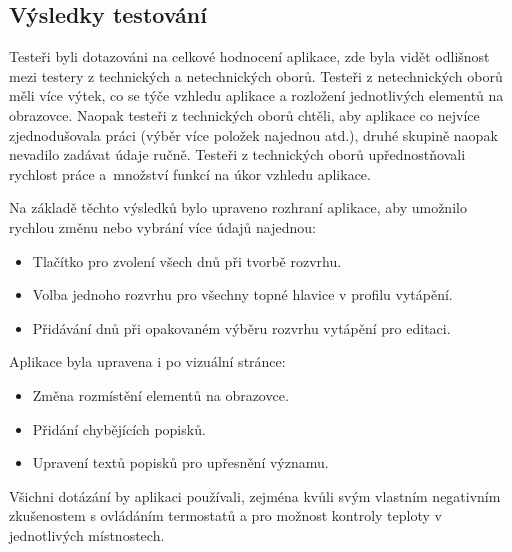 \documentclass[thesis=B,czech]{FITthesis}[2012/10/20]
\begin{document}
\subsection{Výsledky testování}

Testeři byli dotazováni na celkové hodnocení aplikace, zde byla vidět odlišnost mezi testery z technických a netechnických oborů. Testeři z netechnických oborů měli více výtek, co se týče vzhledu aplikace a rozložení jednotlivých elementů na obrazovce. Naopak testeři z technických oborů chtěli, aby aplikace co nejvíce zjednodušovala práci (výběr více položek najednou atd.), druhé skupině naopak nevadilo zadávat údaje ručně. Testeři z technických oborů upřednostňovali rychlost práce a~množství funkcí na úkor vzhledu aplikace. 

Na základě těchto výsledků bylo upraveno rozhraní aplikace, aby umožnilo rychlou změnu nebo vybrání více údajů najednou:

\begin{itemize}
\item Tlačítko pro zvolení všech dnů při tvorbě rozvrhu.
\item Volba jednoho rozvrhu pro všechny topné hlavice v profilu vytápění.
\item Přidávání dnů při opakovaném výběru rozvrhu vytápění pro editaci.
\end{itemize}

Aplikace byla upravena i po vizuální stránce:

\begin{itemize}
\item Změna rozmístění elementů na obrazovce.
\item Přidání chybějících popisků.
\item Upravení textů popisků pro upřesnění významu.
\end{itemize}

Všichni dotázání by aplikaci používali, zejména kvůli svým vlastním negativním zkušenostem s ovládáním termostatů a pro možnost kontroly teploty v jednotlivých místnostech.
\end{document}
